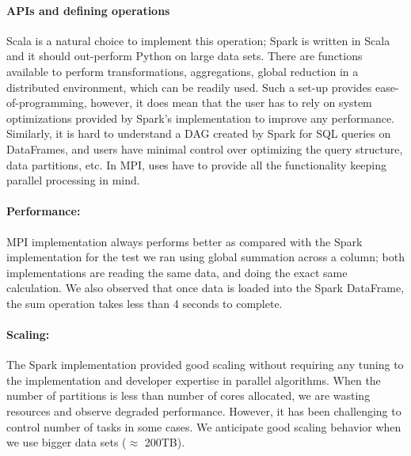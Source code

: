 \documentclass[10pt, twocolumn]{article}
\begin{document}
\paragraph{APIs and defining operations} 
Scala is a natural choice to implement this operation; Spark is written in Scala 
and it should out-perform Python on large data sets.  
 There are functions available to
  perform transformations, aggregations, global reduction in a distributed environment, which can be
  readily used. Such a set-up provides ease-of-programming, however, it does mean that the user has to
  rely on system optimizations provided by Spark's implementation to
  improve any performance. 
Similarly, it is hard to understand a DAG created by Spark for SQL queries on 
DataFrames, and users have minimal control over optimizing the 
query structure, data partitions, etc. In MPI, uses have to provide all the functionality keeping 
parallel processing in mind. 


\paragraph{Performance: } 

MPI implementation always performs better as compared with the Spark 
implementation for the test we ran using global summation across a column; 
both implementations are reading the same data, and doing the exact same calculation. 
We also observed that once data is loaded into the Spark DataFrame, the sum operation takes 
less than 4 seconds to complete. 
 
\paragraph{Scaling: }
The Spark implementation provided good
  scaling without requiring any tuning to the implementation and
  developer expertise in parallel algorithms. 
  When the number of partitions is less than number of cores allocated, 
we are wasting resources and observe degraded performance. 
However, it has been challenging to control number of tasks in some cases. 
We anticipate good scaling behavior when we use bigger data sets ($\approx$ 200TB). 
   
\end{document}
